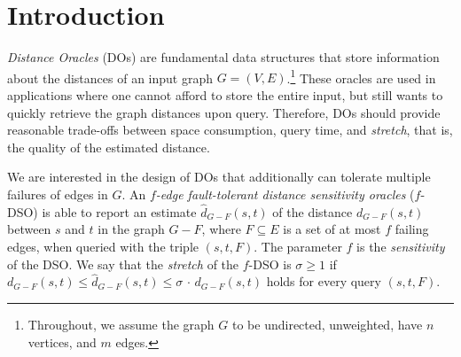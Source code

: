 \documentclass{article}\usepackage[a4paper,margin=20mm]{geometry}
\renewcommand{\leq}{\leqslant}
\renewcommand{\geq}{\geqslant}
\begin{document}
\section{Introduction}
\label{sec:intro}

\emph{Distance Oracles} (DOs) are fundamental data structures 
that store information about the distances of an input graph $G=(V,E)$.\footnote{%
	Throughout, we assume the graph $G$ to be undirected, unweighted, have $n$ vertices,
	and $m$ edges.
}
These oracles are used in applications where one cannot afford to store the entire input,
but still wants to quickly retrieve the graph distances upon query.
Therefore, DOs should provide reasonable  trade-offs between space consumption, query time,
and \emph{stretch}, that is, the quality of the estimated distance. 

We are interested in the design of DOs that additionally can tolerate multiple failures of edges in $G$. 
An \emph{$f$-edge fault-tolerant distance sensitivity oracles} ($f$-DSO) is able to report an estimate $\widehat{d}_{G-F}(s,t)$ of the distance $d_{G-F}(s,t)$ between $s$ and $t$ in the graph $G-F$, where $F \subseteq E$ is a set of at most $f$ failing edges, when queried with the triple $(s,t,F)$. 
The parameter $f$ is the \emph{sensitivity} of the DSO.
We say that the \emph{stretch} of the $f$-DSO is $\sigma \geq 1$ if $d_{G-F}(s,t) \leq \widehat{d}_{G-F}(s,t) \leq \sigma \,{\cdot}\, d_{G-F}(s,t)$ holds for every query $(s,t,F)$. 
\end{document}
